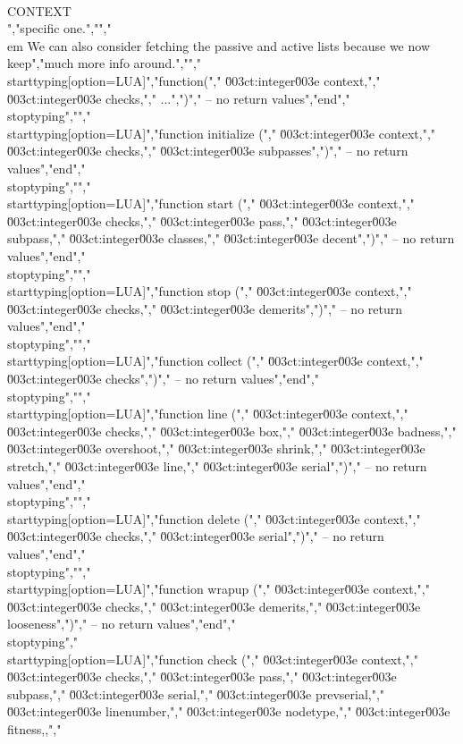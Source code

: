 \\CONTEXT\\","specific one.","","{\\em We can also consider fetching the passive and active lists because we now keep","much more info around.}","","\\starttyping[option=LUA]","function(","    \u003ct:integer\u003e context,","    \u003ct:integer\u003e checks,","    ...",")","    -- no return values","end","\\stoptyping","","\\starttyping[option=LUA]","function initialize (","    \u003ct:integer\u003e context,","    \u003ct:integer\u003e checks,","    \u003ct:integer\u003e subpasses",")","    -- no return values","end","\\stoptyping","","\\starttyping[option=LUA]","function start (","    \u003ct:integer\u003e context,","    \u003ct:integer\u003e checks,","    \u003ct:integer\u003e pass,","    \u003ct:integer\u003e subpass,","    \u003ct:integer\u003e classes,","    \u003ct:integer\u003e decent",")","    -- no return values","end","\\stoptyping","","\\starttyping[option=LUA]","function stop (","    \u003ct:integer\u003e context,","    \u003ct:integer\u003e checks,","    \u003ct:integer\u003e demerits",")","    -- no return values","end","\\stoptyping","","\\starttyping[option=LUA]","function collect (","    \u003ct:integer\u003e context,","    \u003ct:integer\u003e checks",")","    -- no return values","end","\\stoptyping","","\\starttyping[option=LUA]","function line (","    \u003ct:integer\u003e context,","    \u003ct:integer\u003e checks,","    \u003ct:integer\u003e box,","    \u003ct:integer\u003e badness,","    \u003ct:integer\u003e overshoot,","    \u003ct:integer\u003e shrink,","    \u003ct:integer\u003e stretch,","    \u003ct:integer\u003e line,","    \u003ct:integer\u003e serial",")","    -- no return values","end","\\stoptyping","","\\starttyping[option=LUA]","function delete (","    \u003ct:integer\u003e context,","    \u003ct:integer\u003e checks,","    \u003ct:integer\u003e serial",")","    -- no return values","end","\\stoptyping","","\\starttyping[option=LUA]","function wrapup (","    \u003ct:integer\u003e context,","    \u003ct:integer\u003e checks,","    \u003ct:integer\u003e demerits,","    \u003ct:integer\u003e looseness",")","    -- no return values","end","\\stoptyping","\\starttyping[option=LUA]","function check (","    \u003ct:integer\u003e context,","    \u003ct:integer\u003e checks,","    \u003ct:integer\u003e pass,","    \u003ct:integer\u003e subpass,","    \u003ct:integer\u003e serial,","    \u003ct:integer\u003e prevserial,","    \u003ct:integer\u003e linenumber,","    \u003ct:integer\u003e nodetype,","    \u003ct:integer\u003e fitness,,","    